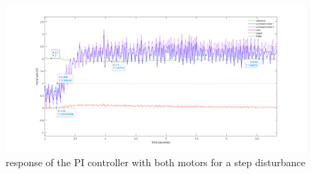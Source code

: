 \begin{figure}[H]
    \centering
    \includegraphics[width=\textwidth]{Pictures/disturbance_rejection.png}
    \caption{response of the PI controller with both motors for a step disturbance}
    \label{fig:step disturbance for both}
\end{figure}
